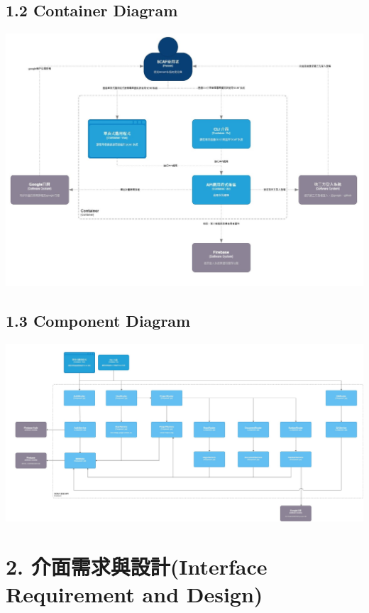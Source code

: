 \documentclass{report}
\begin{document}
\subsection*{1.2 Container Diagram}
\includegraphics[width=\textwidth]{assets/SCAF_C4_Container.jpg}

\subsection*{1.3 Component Diagram}
\includegraphics[width=\textwidth]{assets/SCAF_C4_Component.jpg}

\section*{2. 介面需求與設計(Interface Requirement and Design)}

\newcolumntype{R}{X}
\end{document}
